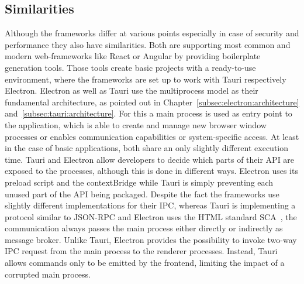 \subsection{Similarities}\label{subsec:similarities}
Although the frameworks differ at various points especially in case of security and performance they also have similarities.
Both are supporting most common and modern web-frameworks like React or Angular by providing boilerplate generation tools.
Those tools create basic projects with a ready-to-use environment, where the frameworks are set up to work with Tauri respectively Electron.
Electron as well as Tauri use the multiprocess model as their fundamental architecture, as pointed out in Chapter~\ref{subsec:electron:architecture} and~\ref{subsec:tauri:architecture}.
For this a main process is used as entry point to the application, which is able to create and manage new browser window processes or enables communication capabilities or system-specific access.
At least in the case of basic applications, both share an only slightly different execution time.
Tauri and Electron allow developers to decide which parts of their \ac{API} are exposed to the processes, although this is done in different ways.
Electron uses its preload script and the contextBridge while Tauri is simply preventing each unused part of the \ac{API} being packaged.
Despite the fact the frameworks use slightly different implementations for their \ac{IPC}, whereas Tauri is implementing a protocol similar to \ac{JSON-RPC} and Electron uses the \ac{HTML} standard \ac{SCA}~\cite{ElectronDoc},
the communication always passes the main process either directly or indirectly as message broker.
Unlike Tauri, Electron provides the possibility to invoke two-way \ac{IPC} request from the main process to the renderer processes.
Instead, Tauri allows commands only to be emitted by the frontend, limiting the impact of a corrupted main process.



